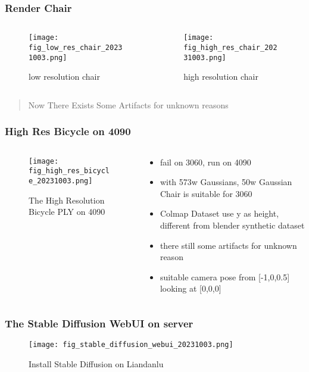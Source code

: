     \begin{frame}
        \frametitle{Render Chair}
        \begin{columns}[c]
            \begin{column}{0.5\textwidth}
                \begin{figure}
                    \texttt{[image: fig\_low\_res\_chair\_20231003.png]}
                    \caption{low resolution chair}
                \end{figure}
            \end{column}
            \begin{column}{0.5\textwidth}
                \begin{figure}
                    \texttt{[image: fig\_high\_res\_chair\_20231003.png]}
                    \caption{high resolution chair}
                \end{figure}
            \end{column}
        \end{columns}
        \begin{quote}
            Now There Exists Some Artifacts for unknown reasons
        \end{quote}
    \end{frame}
    
    \begin{frame}
        \frametitle{High Res Bicycle on 4090}
        \begin{columns}[c]
            \begin{column}{0.5\textwidth}
                \begin{figure}
                    \texttt{[image: fig\_high\_res\_bicycle\_20231003.png]}
                    \caption{The High Resolution Bicycle PLY on 4090}
                \end{figure}
                \end{column}
            \begin{column}{0.5\textwidth}
                \begin{itemize}
                    \item fail on 3060, run on 4090
                    \item with 573w Gaussians, 50w Gaussian Chair is suitable for 3060
                    \item Colmap Dataset use y as height, different from blender synthetic dataset 
                    \item there still some artifacts for unknown reason 
                    \item suitable camera pose from [-1,0,0.5] looking at [0,0,0]
                \end{itemize}
            \end{column}
        \end{columns}
    \end{frame}
    
    \begin{frame}
        \frametitle{The Stable Diffusion WebUI on server}
        \begin{figure}
            \texttt{[image: fig\_stable\_diffusion\_webui\_20231003.png]}
            \caption{Install Stable Diffusion on Liandanlu}
        \end{figure}
    \end{frame}
    
    
    